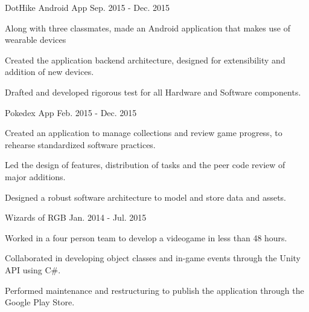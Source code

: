 \begin{cventries}
  \cventry
    {DotHike Android App} %
    {} %
    {} %
    {Sep. 2015 - Dec. 2015} %
    {
      \begin{cvitems} %
        \item {Along with three classmates, made an Android application that makes use of wearable devices}
        \item {Created the application backend architecture, designed for extensibility and addition of new devices.}
        \item {Drafted and developed rigorous test for all Hardware and Software components.}
        \\
      \end{cvitems}
    }
    
  \cventry
    {Pokedex App} %
    {} %
    {} %
    {Feb. 2015 - Dec. 2015} %
    {
      \begin{cvitems} %
        \item {Created an application to manage collections and review game progress, to rehearse standardized software practices.}
        \item {Led the design of features, distribution of tasks and the peer code review of major additions.}
        \item {Designed a robust software architecture to model and store data and assets.}
        \\
      \end{cvitems}
    } 

  \cventry
    {Wizards of RGB} %
    {} %
    {} %
    {Jan. 2014 - Jul. 2015} %
    {
      \begin{cvitems} %
        \item {Worked in a four person team to develop a videogame in less than 48 hours.}
        \item {Collaborated in developing object classes and in-game events through the Unity API using C\#.}
        \item {Performed maintenance and restructuring to publish the application through the Google Play Store.}
        \\
      \end{cvitems}
    } 

\end{cventries}

